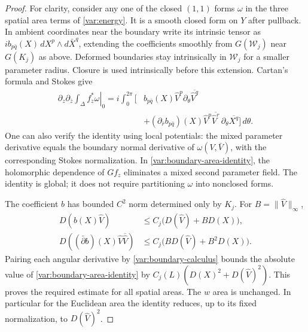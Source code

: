 \begin{proof}
For clarity, consider any one of the closed $(1,1)$ forms $\omega$ in
the three spatial area terms of \eqref{var:energy}.  It is a smooth
closed form on $Y$ after pullback.  In ambient coordinates near the
boundary write its intrinsic tensor as
$i b_{p\bar q}(X)\,dX^p\wedge d\bar X^q$, extending the coefficients
smoothly from $G(\mathcal W_j)$ near $G(K_j)$ as above.  Deformed
boundaries stay intrinsically in $\mathcal W_j$ for a smaller parameter
radius.  Closure is used intrinsically
before this extension.  Cartan's formula and Stokes give
\begin{equation}
 \begin{split}
 \left.\partial_z\partial_{\bar z}
       \int_\Delta f_z^*\omega\right|_0
 =i\int_0^{2\pi}\bigl[&
 b_{p\bar q}(X)\widehat V^p\partial_\theta
                         \overline{\widehat V^q}\\
 &+(\partial_{\bar r}b_{p\bar q})(X)
 \widehat V^p\overline{\widehat V^r}\,
                         \partial_\theta\overline{X^q}\bigr]\,d\theta.
 \end{split}
 \label{var:boundary-area-identity}
\end{equation}
One can also verify the identity using local potentials: the mixed
parameter derivative equals the boundary normal derivative of
$\omega(V,\bar V)$, with the corresponding Stokes normalization.
In \eqref{var:boundary-area-identity}, the holomorphic dependence of
$Gf_z$ eliminates a mixed second parameter field.  The identity is
global; it does not require partitioning $\omega$ into nonclosed forms.

The coefficient $b$ has bounded $C^2$ norm determined only by $K_j$.
For $B=\|\widehat V\|_\infty$,
\[
 \begin{split}
 D(b(X)\widehat V)&\le C_j\bigl(D(\widehat V)+B D(X)\bigr),\\
 D((\bar\partial b)(X)\widehat V\overline{\widehat V})
 &\le C_j\bigl(BD(\widehat V)+B^2D(X)\bigr).
 \end{split}
\]
Pairing each angular derivative by \eqref{var:boundary-calculus}
bounds the absolute value of \eqref{var:boundary-area-identity} by
$C_j(L)(D(X)^2+D(\widehat V)^2)$.  This proves the required estimate
for all spatial areas.  The $w$ area is unchanged.  In particular for
the Euclidean area the identity reduces, up to its fixed normalization,
to $D(\widehat V)^2$.


\end{proof}
